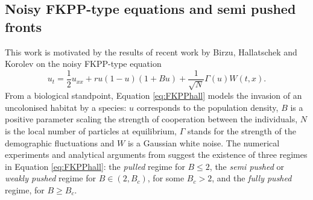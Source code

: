 \documentclass[11pt]{article}
\theoremstyle{plain}
\begin{document}
\subsection{Noisy FKPP-type equations and semi pushed fronts}\label{sec:relatedmodel}

This work is motivated by the results of recent work by Birzu, Hallatschek and Korolev \cite{Birzu2018,Birzu:2020up} on the noisy FKPP-type equation  
\begin{equation}
u_t=\frac{1}{2}u_{xx}+ru(1-u)(1+Bu)+\frac{1}{\sqrt{N}}\Gamma(u)W(t,x). \label{eq:FKPPhall}
\end{equation}  From a biological standpoint, Equation \eqref{eq:FKPPhall} models the invasion of an uncolonised habitat by a species:  $u$ corresponds to the population density, $B$ is a positive parameter scaling the strength of cooperation between the individuals, $N$ is the local number of particles at   equilibrium, $\Gamma$ stands for the strength of the demographic fluctuations and $W$ is a Gaussian white noise. The numerical experiments and analytical arguments from \cite{Birzu2018,Birzu:2020up} suggest the existence of three regimes in Equation \eqref{eq:FKPPhall}: the \textit{pulled} regime for $B\leqslant 2$, the \textit{semi pushed} or \textit{weakly pushed} regime for $B\in(2,B_c)$, for some $B_c>2$, and the \textit{fully pushed} regime, for $B\geqslant B_c$. 
\end{document}
